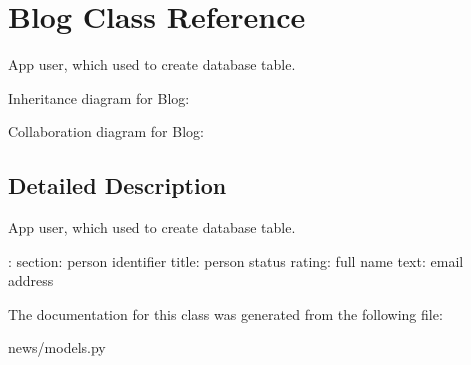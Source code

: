 \hypertarget{class_blog}{}\section{Blog Class Reference}
\label{class_blog}


App user, which used to create database table.  




Inheritance diagram for Blog\+:


Collaboration diagram for Blog\+:


\subsection{Detailed Description}
App user, which used to create database table. 

\+: section\+: person identifier title\+: person status rating\+: full name text\+: email address 

The documentation for this class was generated from the following file\+:\begin{DoxyCompactItemize}
\item 
news/models.\+py\end{DoxyCompactItemize}
